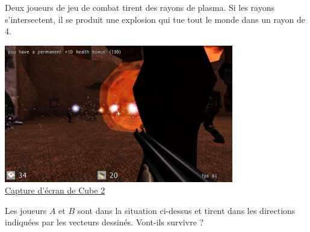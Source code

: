 
\begin{exercice}\label{exosmath-0339}

    Deux joueurs de jeu de combat tirent des rayons de plasma. Si les rayons s'intersectent, il se produit une explosion qui tue tout le monde dans un rayon de \unit{4}{\meter}. 



    \begin{minipage}{0.5\textwidth}
        \begin{center}
\includegraphics[width=10cm]{screenshot_5891783.pdf}\\
\href{http://sauerbraten.org/}{Capture d'écran de Cube 2}
        \end{center}
    \end{minipage}
    \hspace{1mm}
    \begin{minipage}{0.5\textwidth}
        \begin{center}

        \end{center}
    \end{minipage}

    Les joueurs \( A\) et \( B\) sont dans la situation ci-dessus et tirent dans les directions indiquées par les vecteurs dessinés. Vont-ils survivre ? 
    
\end{exercice}
